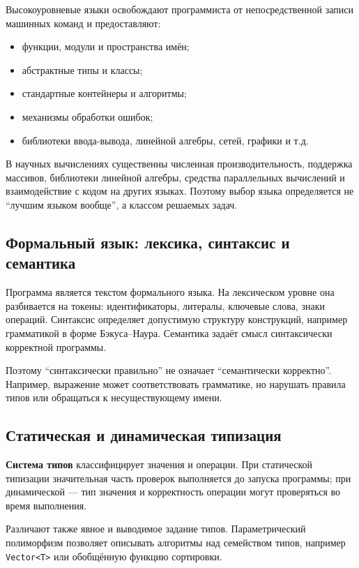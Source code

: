 Высокоуровневые языки освобождают программиста от непосредственной записи машинных команд и предоставляют:
\begin{itemize}
\item функции, модули и пространства имён;
\item абстрактные типы и классы;
\item стандартные контейнеры и алгоритмы;
\item механизмы обработки ошибок;
\item библиотеки ввода-вывода, линейной алгебры, сетей, графики и т.д.
\end{itemize}

В научных вычислениях существенны численная производительность, поддержка массивов, библиотеки линейной алгебры, средства параллельных вычислений и взаимодействие с кодом на других языках. Поэтому выбор языка определяется не ``лучшим языком вообще'', а классом решаемых задач.


\subsection{Формальный язык: лексика, синтаксис и семантика}

Программа является текстом формального языка. На лексическом уровне она
разбивается на токены: идентификаторы, литералы, ключевые слова, знаки операций.
Синтаксис определяет допустимую структуру конструкций, например грамматикой
в форме Бэкуса--Наура. Семантика задаёт смысл синтаксически корректной
программы.

Поэтому ``синтаксически правильно'' не означает ``семантически корректно''.
Например, выражение может соответствовать грамматике, но нарушать правила типов
или обращаться к несуществующему имени.

\subsection{Статическая и динамическая типизация}

\textbf{Система типов} классифицирует значения и операции. При статической
типизации значительная часть проверок выполняется до запуска программы; при
динамической --- тип значения и корректность операции могут проверяться во
время выполнения.

Различают также явное и выводимое задание типов. Параметрический полиморфизм
позволяет описывать алгоритмы над семейством типов, например
\verb|Vector<T>| или обобщённую функцию сортировки.

